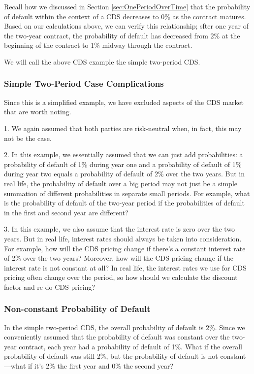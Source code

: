 \documentclass[article]{jss}
\begin{document}
Recall how we discussed in Section \ref{sec:OnePeriodOverTime} that the probability of default within the context of a CDS decreases to 0\% as the contract matures. Based on our calculations above, we can verify this relationship; sfter one year of the two-year contract, the probability of default has decreased from 2\% at the beginning of the contract to 1\% midway through the contract.

We will call the above CDS example the simple two-period CDS.

\subsubsection{Simple Two-Period Case Complications}

Since this is a simplified example, we have excluded aspects of the CDS market that are worth noting.

1. We again assumed that both parties are risk-neutral when, in fact, this may not be the case. 

2. In this example, we essentially assumed that we can just add probabilities: a probability of default of 1\% during year one and a probability of default of 1\% during year two equals a probability of default of 2\% over the two years. But in real life, the probability of default over a big period may not just be a simple summation of different probabilities in separate small periods. For example, what is the probability of default of the two-year period if the probabilities of default in the first and second year are different?

3. In this example, we also assume that the interest rate is zero over the two years. But in real life, interest rates should always be taken into consideration. For example, how will the CDS pricing change if there's a constant interest rate of 2\% over the two years? Moreover, how will the CDS pricing change if the interest rate is not constant at all? In real life, the interest rates we use for CDS pricing often change over the period, so how should we calculate the discount factor and re-do CDS pricing?

\subsubsection{Non-constant Probability of Default}

In the simple two-period CDS, the overall probability of default is 2\%. Since we conveniently assumed that the probability of default was constant over the two-year contract, each year had a probability of default of 1\%. What if the overall probability of default was still 2\%, but the probability of default is not constant---what if it's 2\% the first year and 0\% the second year?
\end{document}
